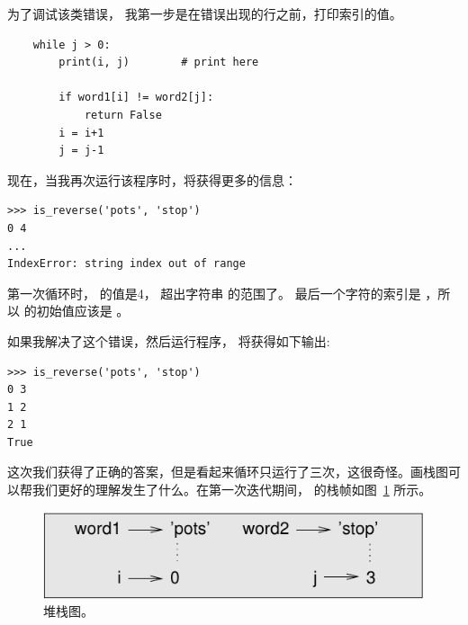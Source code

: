 %

为了调试该类错误， 我第一步是在错误出现的行之前，打印索引的值。

\begin{lstlisting}
    while j > 0:
        print(i, j)        # print here

        if word1[i] != word2[j]:
            return False
        i = i+1
        j = j-1
\end{lstlisting}

%

现在，当我再次运行该程序时，将获得更多的信息：

\begin{lstlisting}
>>> is_reverse('pots', 'stop')
0 4
...
IndexError: string index out of range
\end{lstlisting}

%

第一次循环时，  的值是4， 超出字符串  的范围了。 最后一个字符的索引是 ，所以  的初始值应该是  。


如果我解决了这个错误，然后运行程序， 将获得如下输出:

\begin{lstlisting}
>>> is_reverse('pots', 'stop')
0 3
1 2
2 1
True
\end{lstlisting}

%

这次我们获得了正确的答案，但是看起来循环只运行了三次，这很奇怪。画栈图可以帮我们更好的理解发生了什么。在第一次迭代期间，  的栈帧如图~\ref{fig.state4} 所示。

\begin{figure}
\centerline
{\includegraphics[scale=0.8]{../source/figs/state4.pdf}}
\caption{堆栈图。}
\label{fig.state4}
\end{figure}

